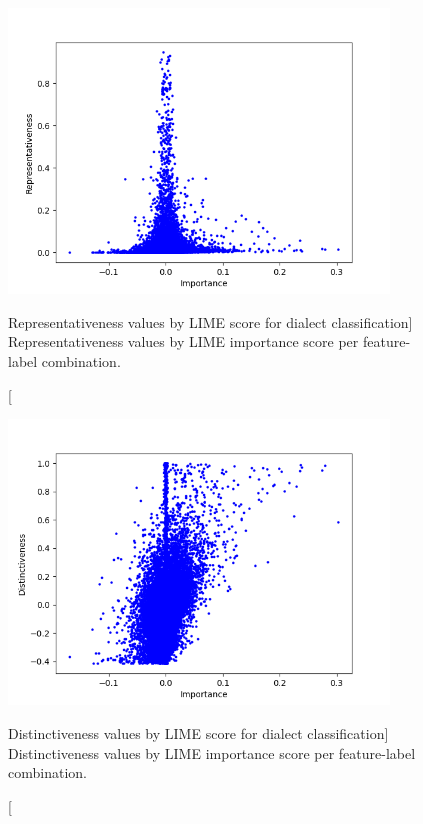 \begin{figure}[htbp]
    \centering
    \includegraphics[width=0.9\textwidth]{figures/3-dialects/importance-rep-all-mean-unscaled.png}
    \caption
    [Representativeness values by LIME score for dialect classification]
    {Representativeness values by LIME importance score per feature-label combination.}
    \label{fig:imp-rep}
\end{figure}
\begin{figure}[htbp]
    \centering
    \includegraphics[width=0.9\textwidth]{figures/3-dialects/importance-dist-all-mean-unscaled.png}
    \caption
    [Distinctiveness values by LIME score for dialect classification]
    {Distinctiveness values by LIME importance score per feature-label combination.}
    \label{fig:imp-dist}
\end{figure}

